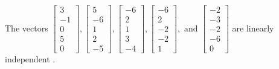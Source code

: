 \begin{exercise}
\begin{exerciseStatement}
  \end{exerciseStatement}
  \begin{exerciseAnswer}
   The vectors \(\left[\begin{array}{r}
3 \\
-1 \\
0 \\
5 \\
0
\end{array}\right] , \left[\begin{array}{r}
5 \\
-6 \\
1 \\
2 \\
-5
\end{array}\right] , \left[\begin{array}{r}
-6 \\
2 \\
1 \\
3 \\
-4
\end{array}\right] , \left[\begin{array}{r}
-6 \\
2 \\
-2 \\
-2 \\
1
\end{array}\right] , \text{ and } \left[\begin{array}{r}
-2 \\
-3 \\
-2 \\
-6 \\
0
\end{array}\right]\) are 
  	 linearly independent  .
  


  \end{exerciseAnswer}
\end{exercise}